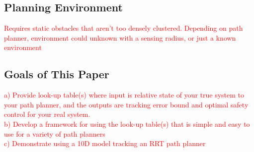\subsection{Planning Environment}
\textcolor{red}{Requires static obstacles that aren't too densely clustered. Depending on path planner, environment could unknown with a sensing radius, or just a known environment}

\subsection{Goals of This Paper}
\textcolor{red}{
	a) Provide look-up table(s) where input is relative state of your true system to your path planner, and the outputs are tracking error bound and optimal safety control for your real system.\\
	b) Develop a framework for using the look-up table(s) that is simple and easy to use for a variety of path planners\\
	c) Demonstrate using a 10D model tracking an RRT path planner}